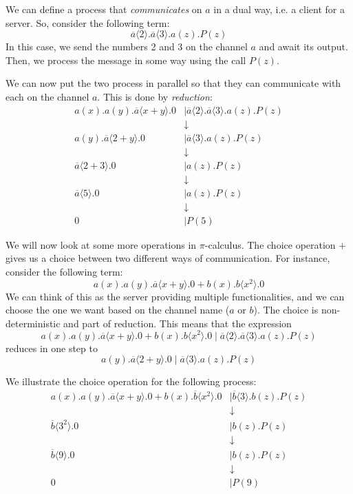 \documentclass[a4paper, openany]{memoir}
\theoremstyle{definition}
\begin{document}
    We can define a process that \emph{communicates} on $a$ in a dual way, i.e. a client for a server. So, consider the following term:
    \[\overline{a} \langle 2 \rangle.\overline{a} \langle 3 \rangle.a(z).P(z)\]
    In this case, we send the numbers 2 and 3 on the channel $a$ and await its output. Then, we process the message in some way using the call $P(z)$.

    We can now put the two process in parallel so that they can communicate with each on the channel $a$. This is done by \emph{reduction}:
    \begin{align*}
        a(x).a(y).\overline{a} \langle x + y \rangle.0 &\mid \overline{a} \langle 2 \rangle.\overline{a} \langle 3 \rangle.a(z).P(z) \\
        &\downarrow \\
        a(y).\overline{a} \langle 2 + y \rangle.0 &\mid \overline{a} \langle 3 \rangle.a(z).P(z) \\
        &\downarrow \\
        \overline{a} \langle 2 + 3 \rangle.0 &\mid a(z).P(z) \\
        &\downarrow \\
        \overline{a} \langle 5 \rangle.0 &\mid a(z).P(z) \\
        &\downarrow \\
        0 &\mid P(5)
    \end{align*}

    We will now look at some more operations in $\pi$-calculus. The choice operation $+$ gives us a choice between two different ways of communication. For instance, consider the following term:
    \[a(x).a(y).\overline{a} \langle x + y \rangle.0 + b(x).b\langle x^2 \rangle.0\]
    We can think of this as the server providing multiple functionalities, and we can choose the one we want based on the channel name ($a$ or $b$). The choice is non-deterministic and part of reduction. This means that the expression 
    \[a(x).a(y).\overline{a} \langle x + y \rangle.0 + b(x).b\langle x^2 \rangle.0 \mid \overline{a} \langle 2 \rangle.\overline{a} \langle 3 \rangle.a(z).P(z)\]
    reduces in one step to
    \[a(y).\overline{a} \langle 2 + y \rangle.0 \mid \overline{a} \langle 3 \rangle.a(z).P(z)\]

    We illustrate the choice operation for the following process:
    \begin{align*}
        a(x).a(y).\overline{a} \langle x + y \rangle.0 + b(x).\overline{b}\langle x^2 \rangle.0 &\mid \overline{b} \langle 3 \rangle.b(z).P(z) \\
        &\downarrow \\
        \overline{b}\langle3^2\rangle.0 &\mid b(z).P(z) \\
        &\downarrow \\
        \overline{b}\langle 9 \rangle.0 &\mid b(z).P(z) \\
        &\downarrow \\
        0 &\mid P(9)
    \end{align*}
\end{document}
